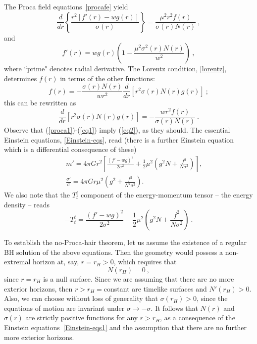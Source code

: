 \documentclass{article}
\numberwithin{equation}{section}
\begin{document}
 The Proca field equations~\eqref{procafe} yield 
 \begin{equation}
 \frac{d}{dr}\left\{\frac{r^2[f'(r)-wg(r)]}{\sigma(r)}\right\}=\frac{\mu^2r^2f(r)}{\sigma(r)N(r)} \ ,
 \label{proca1}
 \end{equation}
 and
 \begin{equation}
 f'(r)=wg(r) \left (1-\frac{\mu^2\sigma^2(r)N(r) }{w^2} \right) \ ,
 \label{eq1}
 \end{equation}
 where ``prime" denotes radial derivative. The Lorentz condition, \eqref{lorentz}, determines $f(r)$ in terms of the other functions:
\begin{equation}
f(r)=-\frac{\sigma(r)N(r)}{wr^2}\frac{d}{dr}\left[r^2\sigma(r)N(r)g(r)\right] \ ;
\label{lor}
\end{equation} 
this can be rewritten as
\begin{equation}
\frac{d}{dr}\left[r^2\sigma(r)N(r)g(r)\right] =-\frac{wr^2 f(r)}{\sigma(r)N(r)}\ .
\label{eq2}
\end{equation} 
 Observe that (\ref{proca1})-(\ref{eq1}) imply (\ref{eq2}), as they should. 
%
The essential Einstein equations, \eqref{Einstein-eqs}, read (there is a further Einstein equation which is a differential consequence of these)
\begin{eqnarray}
\label{Einstein-eqs1}
&&
m'=4\pi G r^2
\left[
\frac{(f'-wg)^2}{2\sigma^2}
+\frac{1}{2}\mu^2 \left(g^2N+\frac{f^2}{N\sigma^2}\right)
\right], \nonumber 
\\
&&\frac{\sigma'}{\sigma}=4\pi G r  \mu^2
\left(g^2+\frac{f^2}{N^2\sigma^2} \right).
\end{eqnarray} 
%
We also note that the $T_t^t$ component of the energy-momentum tensor -- the
energy density -- reads
 \begin{equation}
\label{ro}
-T^t_t=
 \frac{(f'-wg)^2}{2\sigma^2}
+\frac{1}{2}\mu^2 \left(g^2N+\frac{f^2}{N\sigma^2} \right)\ .
\end{equation}
 

To establish the no-Proca-hair theorem, let us assume the existence of a regular BH solution of the above  equations. Then the geometry would possess a non-extremal horizon at, say, 
$r=r_H>0$, which requires that 
 \begin{equation}
N(r_H)=0 \ ,
\end{equation}
since $r=r_H$ is a null surface. Since we are assuming that there are no more exterior horizons, then $r>r_H=$constant are timelike surfaces and $N'(r_H)>0$. Also, we can choose without loss of generality that $\sigma(r_H)>0$, since the equations of motion are invariant under $\sigma\rightarrow -\sigma$. It follows that $N(r)$ and $\sigma(r)$ are strictly positive functions for any $r>r_H$, as a consequence of the Einstein equations~\eqref{Einstein-eqs1} and the assumption that there are no further more exterior horizons.
\end{document}
